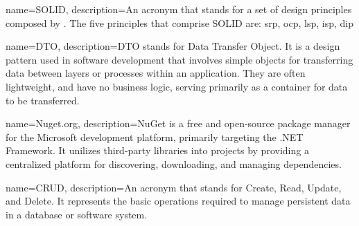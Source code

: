 


{ name=SOLID, description={An acronym that stands for a set of design principles
    composed by . The five
    principles that comprise SOLID are: \acrlong*{srp}, \acrlong*{ocp}, \acrlong*{lsp},
    \acrlong*{isp}, \acrlong*{dip}} }

{ name=DTO, description={DTO stands for Data Transfer Object. It is a design pattern used
    in software development that involves simple objects for transferring data between
    layers or processes within an application. They are often lightweight, and have no
    business logic, serving primarily as a container for data to be transferred.} }

{ name=Nuget.org, description={NuGet is a free and open-source package manager for the
    Microsoft development platform, primarily targeting the .NET Framework. It unilizes
    third-party libraries into projects by providing a centralized platform for
    discovering, downloading, and managing dependencies.} }

{ name=CRUD, description={An acronym that stands for Create, Read, Update, and Delete. It
represents the basic operations required to manage persistent data in a database or
software system.} }